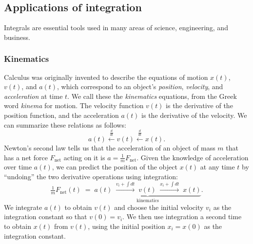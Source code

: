 
	\subsection{Applications of integration}

		Integrals are essential tools used in many areas of science, engineering, and business.

		\subsubsection{Kinematics}

    			Calculus was originally invented
			to describe the equations of motion $x(t)$, $v(t)$, and $a(t)$,
			which correspond to an object's
			\emph{position}, \emph{velocity}, and \emph{acceleration} at time $t$.
			We call these the \emph{kinematics} equations,
			from the Greek word \emph{kinema} for motion.
			The velocity function $v(t)$ is the derivative of the position function,
			and the acceleration $a(t)$ is the derivative of the velocity.
			We can summarize these relations as follows:
			\[
				a(t) \overset{\frac{d}{dt} }{\longleftarrow} v(t) \overset{\frac{d}{dt} }{\longleftarrow} x(t).
			\]
			Newton's second law tells us that the acceleration of an object of mass $m$
			that has a net force $F_{\textrm{net}}$ acting on it is
			$a = \tfrac{1}{m}F_{\textrm{net}}$.
			Given the knowledge of acceleration over time $a(t)$,
			we can predict the position of the object $x(t)$ at any time $t$
			by ``undoing'' the two derivative operations using integration:
			\[
				  \tfrac{1}{m} F_{\textrm{net}}(t)
				\; = \; 
				\underbrace{ 
				  a(t) \; \overset{v_i + \int\!dt }{\longrightarrow} \; 
				  v(t) \; \overset{x_i + \int\!dt }{\longrightarrow} \; 
				  x(t) 
				}_{\text{kinematics}}.
			\]
			We integrate $a(t)$ to obtain $v(t)$
			and choose the initial velocity $v_i$ as the integration constant so that $v(0) = v_i$.
			We then use integration a second time to obtain $x(t)$ from $v(t)$,
			using the initial position $x_i = x(0)$ as the integration constant.			

